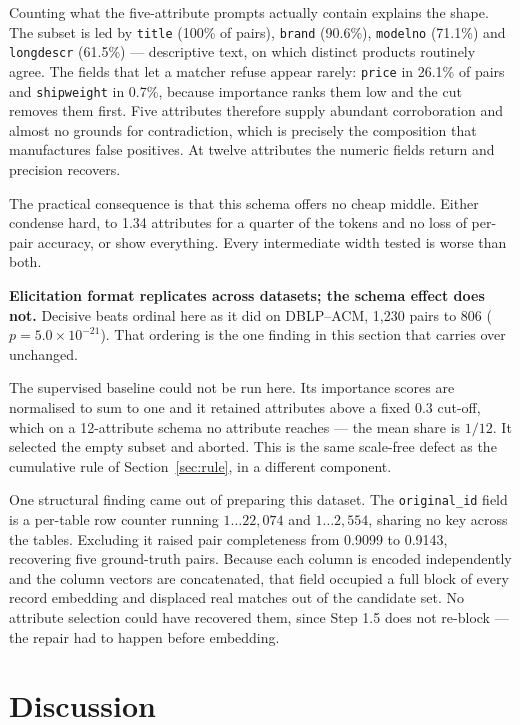 \documentclass[11pt]{article}
\begin{document}
Counting what the five-attribute prompts actually contain explains the shape. The subset is
led by \texttt{title} (100\% of pairs), \texttt{brand} (90.6\%), \texttt{modelno} (71.1\%)
and \texttt{longdescr} (61.5\%) --- descriptive text, on which distinct products routinely
agree. The fields that let a matcher refuse appear rarely: \texttt{price} in 26.1\% of pairs
and \texttt{shipweight} in 0.7\%, because importance ranks them low and the cut removes them
first. Five attributes therefore supply abundant corroboration and almost no grounds for
contradiction, which is precisely the composition that manufactures false positives. At
twelve attributes the numeric fields return and precision recovers.

The practical consequence is that this schema offers no cheap middle. Either condense hard,
to 1.34 attributes for a quarter of the tokens and no loss of per-pair accuracy, or show
everything. Every intermediate width tested is worse than both.

\textbf{Elicitation format replicates across datasets; the schema effect does not.} Decisive
beats ordinal here as it did on DBLP--ACM, 1{,}230 pairs to 806 ($p = 5.0\times10^{-21}$).
That ordering is the one finding in this section that carries over unchanged.

The supervised baseline could not be run here. Its importance scores are normalised to sum
to one and it retained attributes above a fixed 0.3 cut-off, which on a 12-attribute schema
no attribute reaches --- the mean share is $1/12$. It selected the empty subset and aborted.
This is the same scale-free defect as the cumulative rule of Section~\ref{sec:rule}, in a
different component.

One structural finding came out of preparing this dataset. The \texttt{original\_id} field
is a per-table row counter running $1\ldots22{,}074$ and $1\ldots2{,}554$, sharing no key
across the tables. Excluding it raised pair completeness from 0.9099 to 0.9143, recovering
five ground-truth pairs. Because each column is encoded independently and the column vectors
are concatenated, that field occupied a full block of every record embedding and displaced
real matches out of the candidate set. No attribute selection could have recovered them,
since Step 1.5 does not re-block --- the repair had to happen before embedding.

\section{Discussion}
\end{document}
